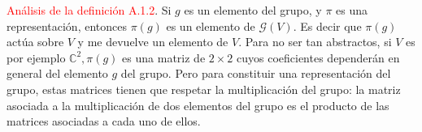 \textcolor{red}{Análisis de la definición A.1.2}. Si $g$ es un elemento del grupo, y $\pi$ es una representación, entonces $\pi(g)$ es un elemento de $\mathcal{G}(V)$. Es decir que $\pi(g)$ actúa sobre $V$ y me devuelve un elemento de $V$. Para no ser tan abstractos, si $V$ es por ejemplo $\mathbb{C}^{2}, \pi(g)$ es una matriz de $2 \times 2$ cuyos coeficientes dependerán en general del elemento $g$ del grupo. Pero para constituir una representación del grupo, estas matrices tienen que respetar la multiplicación del grupo: la matriz asociada a la multiplicación de dos elementos del grupo es el producto de las matrices asociadas a cada uno de ellos.\\







